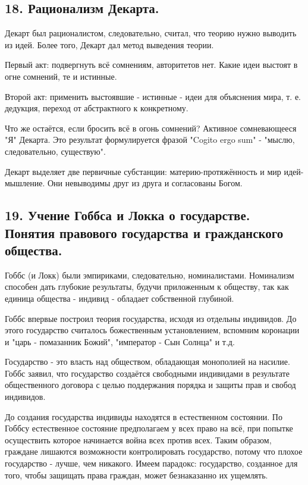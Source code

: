 \documentclass[a4paper, 12pt]{article}
\begin{document}
\subsection*{\textbf{18. Рационализм Декарта.}}

Декарт был рационалистом, следовательно, считал, что теорию нужно выводить из идей.
Более того, Декарт дал метод выведения теории.

Первый акт: подвергнуть всё сомнениям, авторитетов нет.
Какие идеи выстоят в огне сомнений, те и истинные.

Второй акт: применить выстоявшие - истинные - идеи для объяснения мира, т. е. дедукция, переход от абстрактного к конкретному.

Что же остаётся, если бросить всё в огонь сомнений?
Активное сомневающееся "Я" Декарта.
Это результат формулируется фразой "Cogito ergo sum" - "мыслю, следовательно, существую".

Декарт выделяет две первичные субстанции: материю-протяжённость и мир идей-мышление.
Они невыводимы друг из друга и согласованы Богом.

\subsection*{\textbf{19. Учение Гоббса и Локка о государстве. Понятия правового государства и гражданского общества.}}

Гоббс (и Локк) были эмпириками, следовательно, номиналистами.
Номинализм способен дать глубокие результаты, будучи приложенным к обществу, так как единица общества - индивид - обладает собственной глубиной.

Гоббс впервые построил теория государства, исходя из отдельны индивидов.
До этого государство считалось божественным установлением, вспомним коронации и "царь - помазанник Божий", "император - Сын Солнца" и т.д.

Государство - это власть над обществом, обладающая монополией на насилие.
Гоббс заявил, что государство создаётся свободными индивидами в результате общественного договора  с целью поддержания порядка и защиты прав и свобод индивидов.

До создания государства индивиды находятся в естественном состоянии.
По Гоббсу естественное состояние предполагаем у всех право на всё, при попытке осуществить которое начинается война всех против всех.
Таким образом, граждане лишаются возможности контролировать государство, потому что плохое государство - лучше, чем никакого.
Имеем парадокс: государство, созданное для того, чтобы защищать права граждан, может безнаказанно их ущемлять.
\end{document}
